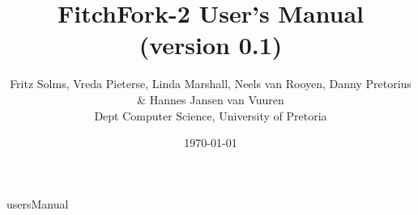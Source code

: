 \documentclass[titlepage]{article}
\title{FitchFork-2 User's Manual \\
          (version 0.1)}
\author{Fritz Solms, Vreda Pieterse, Linda Marshall, Neels van Rooyen, Danny Pretorius \& Hannes Jansen van Vuuren \\ Dept Computer Science, University of Pretoria}
\date{\today}
\begin{document}
\maketitle

\tableofcontents

\newpage

{usersManual}
\end{document}
